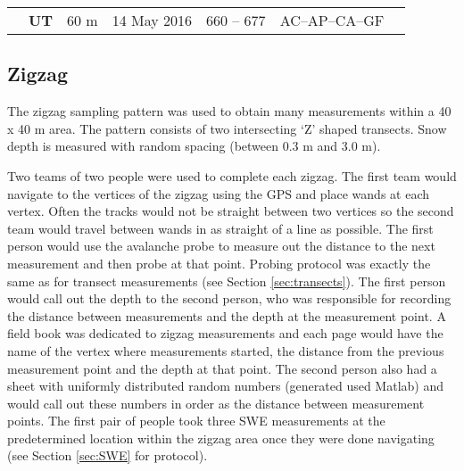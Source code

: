 \documentclass[12pt]{article}
\begin{document}
\begin{landscape}
\begin{table}[]
\begin{tabular}{ccccccl}
                                                                             & \textbf{UT}                                                  & 60 m                                                                     & 14 May 2016   & 660 -- 677                                                                 & AC--AP--CA--GF                                                     &                                                                                                                                                                                                                                                 
\end{tabular}
\end{table}

\end{landscape}

\subsection{Zigzag}

The zigzag sampling pattern was used to obtain many measurements within a 40 x 40 m area.  The pattern consists of two intersecting `Z' shaped transects. Snow depth is measured with random spacing (between 0.3 m and 3.0 m). 

Two teams of two people were used to complete each zigzag. The first team would navigate to the vertices of the zigzag using the GPS and place wands at each vertex. Often the tracks would not be straight between two vertices so the second team would travel between wands in as straight of a line as possible. The first person would use the avalanche probe to measure out the distance to the next measurement and then probe at that point. Probing protocol was exactly the same as for transect measurements (see Section \ref{sec:transects}). The first person would call out the depth to the second person, who was responsible for recording the distance between measurements and the depth at the measurement point. A field book was dedicated to zigzag measurements and each page would have the name of the vertex where measurements started, the distance from the previous measurement point and the depth at that point. The second person also had a sheet with uniformly distributed random numbers (generated used Matlab) and would call out these numbers in order as the distance between measurement points. The first pair of people took three SWE measurements at the predetermined location within the zigzag area once they were done navigating (see Section \ref{sec:SWE} for protocol).
\end{document}
